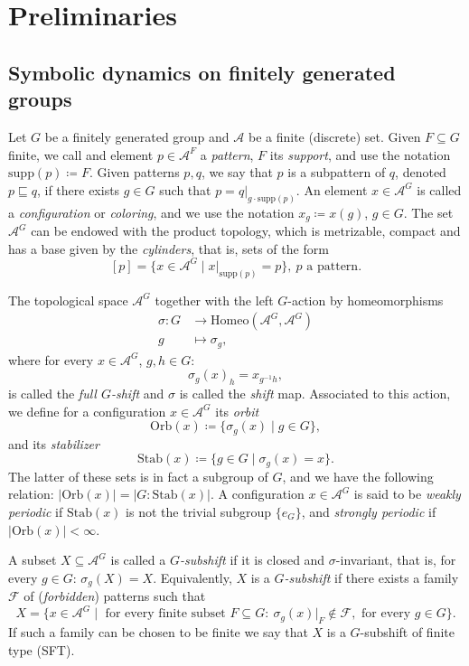 \documentclass[letterpaper,11pt,reqno]{amsart}
\theoremstyle{plain}
\theoremstyle{definition}
\begin{document}
\section{Preliminaries}\label{section:preliminaries}

\subsection{Symbolic dynamics on finitely generated groups}
Let $G$ be a finitely generated group and $\mathcal{A}$ be a finite (discrete) set. Given $F\subseteq G$ finite, we call and element $p\in \mathcal{A}^{F}$ a \textit{pattern}, $F$ its \textit{support}, and use the notation $\mathrm{supp}(p)\coloneqq F$. Given patterns $p,q$, we say that $p$ is a subpattern of $q$, denoted $p\sqsubseteq q$, if there exists $g\in G$ such that $p=q|_{g\cdot \mathrm{supp}(p)}$. An element $x\in \mathcal{A}^G$ is called a \textit{configuration} or \textit{coloring}, and we use the notation $x_g\coloneqq x(g)$, $g\in G$. The set $\mathcal{A}^G$ can be endowed with the product topology, which is metrizable, compact and has a base given by the \textit{cylinders}, that is, sets of the form
$$
[p]=\{x\in \mathcal{A}^G\mid x|_{\mathrm{supp}(p)}=p \}, \ p\text{ a pattern}.
$$ 


The topological space $\mathcal{A}^G$ together with the left $G$-action by homeomorphisms
\begin{align*}
\sigma:G&\to \mathrm{Homeo}(\mathcal{A}^G,\mathcal{A}^G)\\
g&\mapsto \sigma_g,
\end{align*}
where for every $x\in \mathcal{A}^G$, $g,h\in G$:
$$
\sigma_g(x)_h=x_{g^{-1}h},
$$
is called the \textit{full $G$-shift} and $\sigma$ is called the \textit{shift} map. Associated to this action, we define for a configuration $x\in \mathcal{A}^G$ its \textit{orbit} $$\mathrm{Orb}(x)\coloneqq\{\sigma_g(x)\mid g\in G \},$$ and its \textit{stabilizer} $$\mathrm{Stab}(x)\coloneqq \{g\in G\mid \sigma_g(x)=x \}.$$ The latter of these sets is in fact a subgroup of $G$, and we have the following relation: $|\mathrm{Orb}(x)|=|G:\mathrm{Stab}(x)|$. A configuration $x\in \mathcal{A}^G$ is said to be \textit{weakly periodic} if $\mathrm{Stab}(x)$ is not the trivial subgroup $\{e_G\}$, and \textit{strongly periodic} if $|\mathrm{Orb}(x)|<\infty$.


A subset $X\subseteq \mathcal{A}^G$ is called a \textit{$G$-subshift} if it is closed and $\sigma$-invariant, that is, for every $g\in G$: $\sigma_g(X)=X$. Equivalently, $X$ is a \textit{$G$-subshift} if there exists a family $\mathcal{F}$ of (\textit{forbidden}) patterns such that
$$
X=\{x\in \mathcal{A}^G\mid \text{ for every finite subset }F\subseteq G:\ \sigma_g(x)|_{F}\notin \mathcal{F}, \text{ for every }g\in G \}.
$$ 
If such a family can be chosen to be finite we say that $X$ is a $G$-subshift of finite type (SFT).
\end{document}
